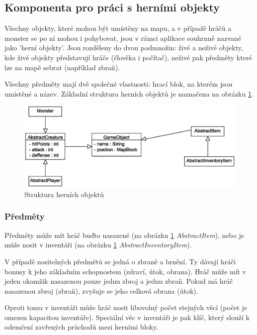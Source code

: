 \documentclass[11pt,a4paper]{scrartcl}
\begin{document}
	\subsection{Komponenta pro práci s herními objekty}
	Všechny objekty, které mohou být umístěny na mapu, a v případě hráčů a monster se po ní mohou i pohybovat, jsou v rámci aplikace souhrnně nazvané jako 'herní objekty'. Jsou rozděleny do dvou podmnožin: živé a neživé objekty, kde živé objekty představují hráče (člověka i počítač), neživé pak předměty které lze na mapě sebrat (například zbraň).
	
	Všechny předměty mají dvě společné vlastnosti: hrací blok, na kterém jsou umístěné a název. Základní struktura herních objektů je naznačena na obrázku \ref{fig:game-obj}. 
	
	\begin{figure}[H]
		\centering
		\includegraphics[width=140mm]{core-game-objects-simple}
		\caption{Struktura herních objektů}
		\label{fig:game-obj}
	\end{figure}
	
	\subsubsection{Předměty}
	Předměty může mít hráč buďto nasazené (na obrázku \ref{fig:game-obj} \textit{AbstractItem}), nebo je může nosit v inventáři (na obrázku \ref{fig:game-obj} \textit{AbstractInventoryItem}). 
	
	V případě nositelných předmětů se jedná o zbraně a brnění. Ty dávají hráči bonusy k jeho základním schopnostem (zdraví, útok, obrana). Hráč může mít v jeden okamžik nasazenou pouze jednu zbroj a jednu zbraň. Pokud má hráč nasazenou zbroj (zbraň), zvyšuje se jeho celková obrana (útok).
	
	Oproti tomu v inventáři může hráč nosit libovolný počet stejných věcí (počet je omezen kapacitou inventáře). Speciální věc v inventáři je pak klíč, který slouží k odemčení zavřených průchodů mezi herními bloky.
	
\end{document}
